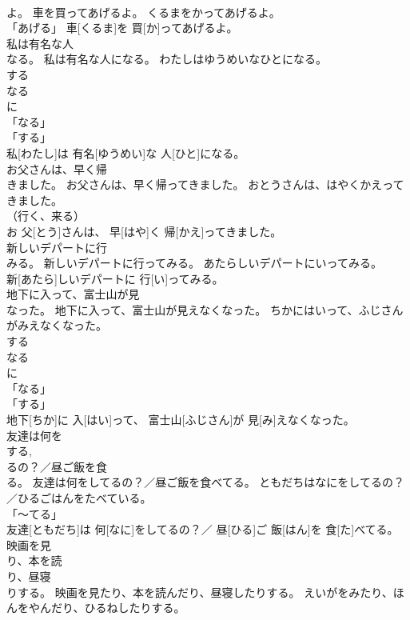 \documentclass[8pt]{extreport}
\begin{document}
\begin{CJK}{UTF8}{min}
\\	よ。	車を買ってあげるよ。	くるまをかってあげるよ。	
\\	「あげる」	車[くるま]を 買[か]ってあげるよ。		
\\	私は有名な人
\\	なる。	私は有名な人になる。	わたしはゆうめいなひとになる。	
\\	する 
\\	なる 
\\	に 
\\	「なる」 
\\	「する」 
\\	私[わたし]は 有名[ゆうめい]な 人[ひと]になる。		
\\	お父さんは、早く帰
\\	きました。	お父さんは、早く帰ってきました。	おとうさんは、はやくかえってきました。	
\\	（行く、来る） 
\\	お 父[とう]さんは、 早[はや]く 帰[かえ]ってきました。		
\\	新しいデパートに行
\\	みる。	新しいデパートに行ってみる。	あたらしいデパートにいってみる。	
\\	新[あたら]しいデパートに 行[い]ってみる。		
\\	地下に入って、富士山が見
\\	なった。	地下に入って、富士山が見えなくなった。	ちかにはいって、ふじさんがみえなくなった。	
\\	する 
\\	なる 
\\	に 
\\	「なる」 
\\	「する」 
\\	地下[ちか]に 入[はい]って、 富士山[ふじさん]が 見[み]えなくなった。		
\\	友達は何を
\\	する, 
\\	るの？／昼ご飯を食
\\	る。	友達は何をしてるの？／昼ご飯を食べてる。	ともだちはなにをしてるの？／ひるごはんをたべている。	
\\	「～てる」 
\\	友達[ともだち]は 何[なに]をしてるの？／ 昼[ひる]ご 飯[はん]を 食[た]べてる。		
\\	映画を見
\\	り、本を読
\\	り、昼寝
\\	りする。	映画を見たり、本を読んだり、昼寝したりする。	えいがをみたり、ほんをやんだり、ひるねしたりする。	

\end{CJK}
\end{document}
